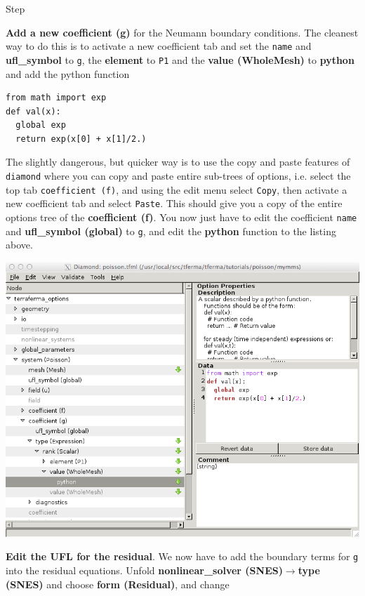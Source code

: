 \begin{steps}{Step}
\begin{center}
  \end{center}
\item \textbf{Add a new coefficient (g)} for the Neumann boundary conditions.  The cleanest way to do this is to activate a new coefficient tab and set the \texttt{name} and \textbf{ufl\_symbol} to \texttt{g},  the \textbf{element} to \texttt{P1} and the \textbf{value (WholeMesh)} to \textbf{python} and add the python function
\begin{lstlisting}[style=python]
from math import exp
def val(x):
  global exp
  return exp(x[0] + x[1]/2.)    
\end{lstlisting}

The slightly dangerous, but quicker way is to use the copy and paste
features of \texttt{diamond} where you can copy and paste entire
sub-trees of options, i.e. select the top tab \texttt{coefficient
  (f)}, and using the edit menu select \texttt{Copy}, then activate a
new coefficient tab and select \texttt{Paste}.  This should give you a
copy of the entire options tree of the \textbf{coefficient (f)}.  You
now just have to edit the coefficient \texttt{name} and
\textbf{ufl\_symbol (global)} to \texttt{g}, and edit the \textbf{python} function to the listing above. 
 \begin{center}
\includegraphics[width=\diamondwidth]{figures/screendumps/diamond_poisson_mms_g_value.png}
  \end{center} 
\item \textbf{Edit the UFL for the residual}. We now have to add the boundary terms for \texttt{g} into the residual equations.  Unfold \textbf{nonlinear\_solver (SNES)}$\rightarrow$\textbf{type (SNES)} and choose \textbf{form (Residual)}, and change

\end{steps}
